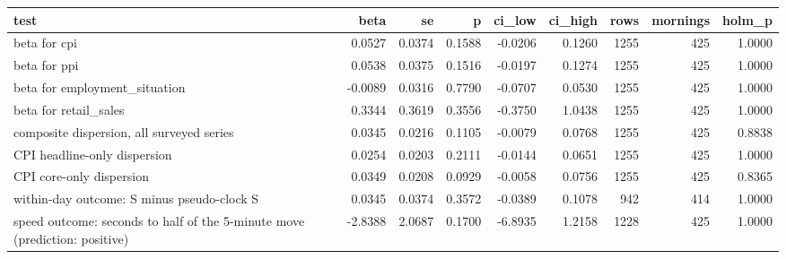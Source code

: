\begin{tabular}{lrrrrrrrr}
\toprule
test & beta & se & p & ci_low & ci_high & rows & mornings & holm_p \\
\midrule
beta for cpi & 0.0527 & 0.0374 & 0.1588 & -0.0206 & 0.1260 & 1255 & 425 & 1.0000 \\
beta for ppi & 0.0538 & 0.0375 & 0.1516 & -0.0197 & 0.1274 & 1255 & 425 & 1.0000 \\
beta for employment_situation & -0.0089 & 0.0316 & 0.7790 & -0.0707 & 0.0530 & 1255 & 425 & 1.0000 \\
beta for retail_sales & 0.3344 & 0.3619 & 0.3556 & -0.3750 & 1.0438 & 1255 & 425 & 1.0000 \\
composite dispersion, all surveyed series & 0.0345 & 0.0216 & 0.1105 & -0.0079 & 0.0768 & 1255 & 425 & 0.8838 \\
CPI headline-only dispersion & 0.0254 & 0.0203 & 0.2111 & -0.0144 & 0.0651 & 1255 & 425 & 1.0000 \\
CPI core-only dispersion & 0.0349 & 0.0208 & 0.0929 & -0.0058 & 0.0756 & 1255 & 425 & 0.8365 \\
within-day outcome: S minus pseudo-clock S & 0.0345 & 0.0374 & 0.3572 & -0.0389 & 0.1078 & 942 & 414 & 1.0000 \\
speed outcome: seconds to half of the 5-minute move (prediction: positive) & -2.8388 & 2.0687 & 0.1700 & -6.8935 & 1.2158 & 1228 & 425 & 1.0000 \\
\bottomrule
\end{tabular}

